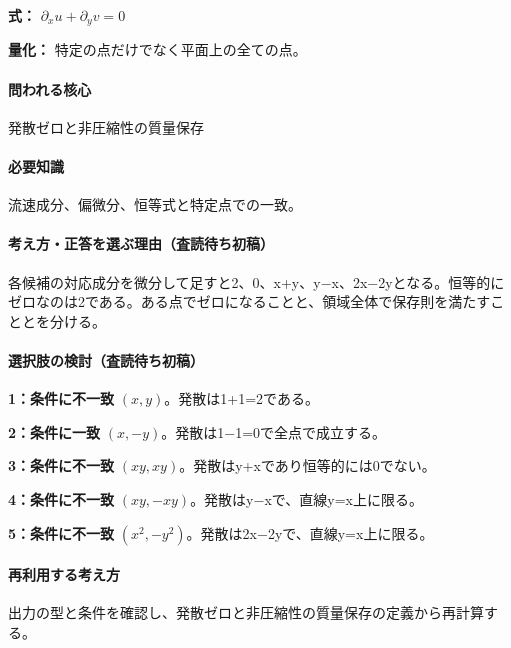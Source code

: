 \noindent\textbf{式：} \(\partial_xu+\partial_yv=0\)\par

\noindent\textbf{量化：} 特定の点だけでなく平面上の全ての点。\par

\paragraph{問われる核心} 発散ゼロと非圧縮性の質量保存

\paragraph{必要知識} 流速成分、偏微分、恒等式と特定点での一致。

\paragraph{考え方・正答を選ぶ理由（査読待ち初稿）} 各候補の対応成分を微分して足すと2、0、x+y、y−x、2x−2yとなる。恒等的にゼロなのは2である。ある点でゼロになることと、領域全体で保存則を満たすこととを分ける。

\paragraph{選択肢の検討（査読待ち初稿）}\mbox{}\par

\noindent\textbf{1：条件に不一致} \((x,y)\)。発散は1+1=\allowbreak{}2である。\par

\noindent\textbf{2：条件に一致} \((x,-y)\)。発散は1−1=\allowbreak{}0で全点で成立する。\par

\noindent\textbf{3：条件に不一致} \((xy,xy)\)。発散はy+xであり恒等的には0でない。\par

\noindent\textbf{4：条件に不一致} \((xy,-xy)\)。発散はy−xで、直線y=\allowbreak{}x上に限る。\par

\noindent\textbf{5：条件に不一致} \((x^2,-y^2)\)。発散は2x−2yで、直線y=\allowbreak{}x上に限る。\par

\paragraph{再利用する考え方} 出力の型と条件を確認し、発散ゼロと非圧縮性の質量保存の定義から再計算する。

